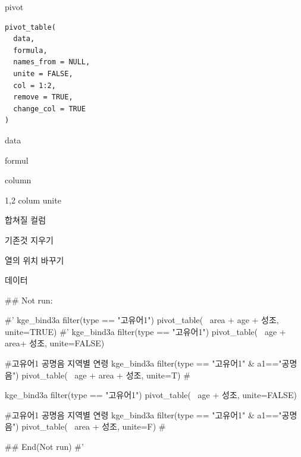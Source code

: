 \documentclass[a4paper]{book}
\begin{document}
%
\begin{Description}
pivot
\end{Description}
%
\begin{Usage}
\begin{verbatim}
pivot_table(
  data,
  formula,
  names_from = NULL,
  unite = FALSE,
  col = 1:2,
  remove = TRUE,
  change_col = TRUE
)
\end{verbatim}
\end{Usage}
%
\begin{Arguments}
\begin{ldescription}
\item[\code{data}] data

\item[\code{formula}] formul

\item[\code{names\_from}] column

\item[\code{unite}] 1,2 colum unite

\item[\code{col}] 합쳐질 컬럼

\item[\code{remove}] 기존것 지우기

\item[\code{change\_col}] 열의 위치 바꾸기
\end{ldescription}
\end{Arguments}
%
\begin{Value}
데이터
\end{Value}
%
\begin{Examples}
\begin{ExampleCode}

\#\# Not run: 

#' kge_bind3a %
filter(type == "고유어1")%
  pivot_table(~ area + age + 성조, unite=TRUE)
#'
kge_bind3a %
  filter(type == "고유어1")%
  pivot_table(~  age + area+ 성조, unite=FALSE)

#고유어1 공명음  지역별 연령
kge_bind3a %
  filter(type == "고유어1" & a1=="공명음")%
  pivot_table(~ age + area + 성조, unite=T)  #%



kge_bind3a %
  filter(type == "고유어1")%
  pivot_table(~  age +  성조, unite=FALSE)

#고유어1 공명음  지역별 연령
kge_bind3a %
  filter(type == "고유어1" & a1=="공명음")%
  pivot_table(~  area + 성조, unite=F)  #%


  
## End(Not run)
#'

\end{ExampleCode}
\end{Examples}
\end{document}
